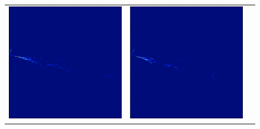 \begin{figure}[htb] 
    \centering
    \begin{tabular}{ccc}
	\includegraphics[scale=0.23]{graphics/cvn_nue_view0.png} &
	\includegraphics[scale=0.23]{graphics/cvn_nue_view1.png} &

\end{tabular}
\end{figure}
